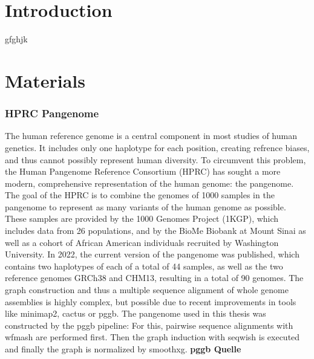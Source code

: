 \documentclass[a4paper,11pt,twoside,openright]{report}
\begin{document}
\graphicspath{{figures/}}


%
%
\clearpage{\pagestyle{empty}\cleardoublepage}
%





\cleardoublepage





\tableofcontents
\cleardoublepage



\markboth{}{}



\setcounter{page}{1}

%
\chapter{Introduction}
gfghjk

%
\chapter{Materials}

\subsection{HPRC Pangenome}
The human reference genome is a central component in most studies of human genetics.\cite{wang2022human} It includes only one haplotype for each position, creating refrence biases, and thus cannot possibly represent human diversity. To circumvent this problem, the Human Pangenome Reference Consortium (HPRC) has sought a more modern, comprehensive representation of the human genome: the pangenome. 
The goal of the HPRC is to combine the genomes of 1000 samples in the pangenome to represent as many variants of the human genome as possible. These samples are provided by the 1000 Genomes Project (1KGP), which includes data from 26 populations, and by the BioMe Biobank at Mount Sinai as well as a cohort of African American individuals recruited by Washington University.\cite{wang2022human}
In 2022, the current version of the pangenome was published, which contains two haplotypes of each of a total of 44 samples, as well as the two reference genomes GRCh38 and CHM13, resulting in a total of 90 genomes.
The graph construction and thus a multiple sequence alignment of whole genome assemblies is highly complex, but possible due to recent improvements in tools like minimap2, cactus or pggb. The pangenome used in this thesis was constructed by the pggb pipeline: For this, pairwise sequence alignments with wfmash are performed first. Then the graph induction with seqwish is executed and finally the graph is normalized by smoothxg. \textbf{pggb Quelle}
\end{document}
